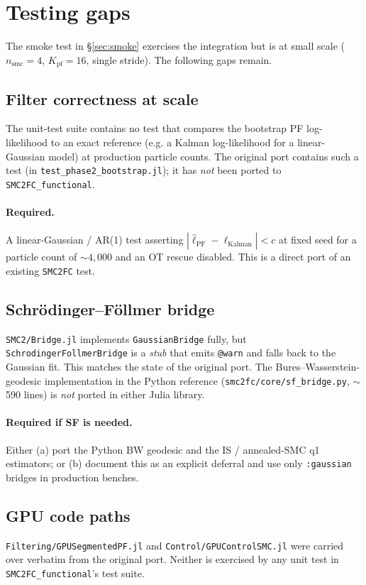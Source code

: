\documentclass[11pt,a4paper]{article}
\begin{document}
\section{Testing gaps}
\label{sec:gaps}

The smoke test in \S\ref{sec:smoke} exercises the integration but is at
small scale ($n_{\mathrm{smc}}{=}4$, $K_{\mathrm{pf}}{=}16$, single
stride). The following gaps remain.

\subsection{Filter correctness at scale}
The unit-test suite contains no test that compares the bootstrap PF
log-likelihood to an exact reference (e.g. a Kalman log-likelihood for a
linear-Gaussian model) at production particle counts. The original port
contains such a test (in \texttt{test\_phase2\_bootstrap.jl}); it has
\emph{not} been ported to \texttt{SMC2FC\_functional}.

\paragraph{Required.} A linear-Gaussian / AR(1) test asserting
$|\hat{\ell}_\mathrm{PF} - \ell_\mathrm{Kalman}| < c$ at fixed seed for a
particle count of $\sim 4{,}000$ and an OT rescue disabled. This is a
direct port of an existing \texttt{SMC2FC} test.

\subsection{Schrödinger--Föllmer bridge}
\texttt{SMC2/Bridge.jl} implements \texttt{GaussianBridge} fully, but
\texttt{SchrodingerFollmerBridge} is a \emph{stub} that emits
\texttt{@warn} and falls back to the Gaussian fit. This matches the
state of the original port. The Bures--Wasserstein-geodesic implementation
in the Python reference (\texttt{smc2fc/core/sf\_bridge.py}, $\sim$590
lines) is \emph{not} ported in either Julia library.

\paragraph{Required if SF is needed.} Either (a) port the Python BW
geodesic and the IS / annealed-SMC q1 estimators; or (b) document this
as an explicit deferral and use only \texttt{:gaussian} bridges in
production benches.

\subsection{GPU code paths}
\texttt{Filtering/GPUSegmentedPF.jl} and \texttt{Control/GPUControlSMC.jl}
were carried over verbatim from the original port. Neither is exercised
by any unit test in \texttt{SMC2FC\_functional}'s test suite.
\end{document}
